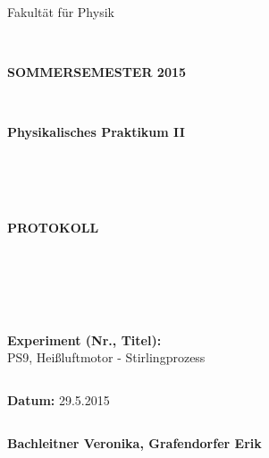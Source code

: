 \documentclass[12pt,a4paper,twopage]{article}
\begin{document}
\thispagestyle{empty}
			\begin{center}
			\Large{Fakultät für Physik}\\
			\end{center}
\begin{verbatim}


\end{verbatim}
			\begin{center}
			\textbf{\LARGE SOMMERSEMESTER 2015}
			\end{center}
\begin{verbatim}


\end{verbatim}
			\begin{center}
			\textbf{\LARGE{Physikalisches Praktikum II}}
			\end{center}
\begin{verbatim}




\end{verbatim}

			\begin{center}
			\textbf{\LARGE{PROTOKOLL}}
			\end{center}
			
\begin{verbatim}





\end{verbatim}

			\begin{flushleft}
			\textbf{\Large{Experiment (Nr., Titel):}}\\
			PS9, Heißluftmotor - Stirlingprozess
			\LARGE{}	
			\end{flushleft}

\begin{verbatim}

\end{verbatim}	
			\begin{flushleft}
			\textbf{\Large{Datum:}} \Large{29.5.2015}
			\end{flushleft}
			
\begin{verbatim}
\end{verbatim}
		\begin{flushleft}
			\textbf{\Large{Bachleitner Veronika, Grafendorfer Erik}} 
			\end{flushleft}
\end{document}
